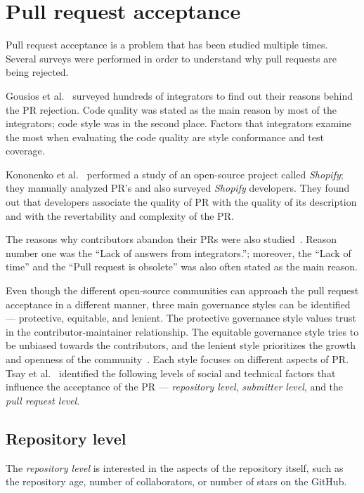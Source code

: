 \documentclass[digital,oneside,oldtable,nolof,nolot,nocover]{fithesis4}
\begin{document}
\chapter{Pull request acceptance}
\label{sec:org83c819e}
Pull request acceptance is a problem that has been studied multiple
times. Several surveys were performed in order to understand why pull requests
are being rejected.

Gousios et al.~\cite{integrator} surveyed hundreds of integrators to find out
their reasons behind the PR rejection. Code quality was stated as the main
reason by most of the integrators; code style was in the second place.
Factors that integrators examine the most when evaluating the code quality are
style conformance and test coverage.

Kononenko et al.~\cite{shopify} performed a study of an open-source project
called \emph{Shopify}; they manually analyzed PR's and also surveyed \emph{Shopify}
developers. They found out that developers associate the quality of PR with
the quality of its description and with the revertability and complexity of
the PR.

The reasons why contributors abandon their PRs were also
studied~\cite{abandonment}. Reason number one was the ``Lack of answers from
integrators.''; moreover, the ``Lack of time'' and the ``Pull request is
obsolete'' was also often stated as the main reason.

Even though the different open-source communities can approach the pull request acceptance in
a different manner, three main governance styles can be
identified --- protective, equitable, and lenient. The protective governance style
values trust in the contributor-maintainer relationship. The equitable
governance style tries to be unbiased towards the contributors, and the
lenient style prioritizes the growth and openness of the community~\cite{foss}.
Each style focuses on different aspects of PR. Tsay et al.~\cite{social}
identified the following levels of social and technical factors that influence
the acceptance of the PR --- \emph{repository level}, \emph{submitter level}, and the
\emph{pull request level}.
\section{Repository level}
\label{sec:org2f48310}
The \emph{repository level} is interested in the aspects of the repository itself,
such as the repository age, number of collaborators, or number of stars on
the GitHub.
\end{document}
